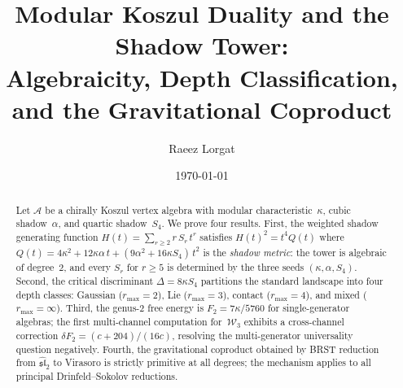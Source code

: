 \documentclass[11pt,reqno]{amsart}
\theoremstyle{definition}
\theoremstyle{remark}
\newcommand{\cA}{\mathcal{A}}
\newcommand{\cW}{\mathcal{W}}
\numberwithin{equation}{section}
\begin{document}
\title[Modular Koszul Duality and the Shadow Tower]
{Modular Koszul Duality and the Shadow Tower:\\
Algebraicity, Depth Classification,\\
and the Gravitational Coproduct}

\author{Raeez Lorgat}
\address{Perimeter Institute for Theoretical Physics,
 Waterloo, ON N2L 2Y5, Canada}

\date{\today}

\begin{abstract}
Let $\cA$ be a chirally Koszul vertex algebra with modular
characteristic~$\kappa$, cubic shadow~$\alpha$, and quartic
shadow~$S_4$. We prove four results.
First, the weighted shadow generating function
$H(t) = \sum_{r \ge 2} r\, S_r\, t^r$ satisfies
$H(t)^2 = t^4 Q(t)$ where
$Q(t) = 4\kappa^2 + 12\kappa\alpha\, t
+ (9\alpha^2 + 16\kappa S_4)\, t^2$
is the \emph{shadow metric}: the tower is algebraic of degree~$2$,
and every $S_r$ for $r \ge 5$ is determined by the three seeds
$(\kappa, \alpha, S_4)$.
Second, the critical discriminant $\Delta = 8\kappa S_4$
partitions the standard landscape into four depth classes:
Gaussian ($r_{\max} = 2$), Lie ($r_{\max} = 3$), contact
($r_{\max} = 4$), and mixed ($r_{\max} = \infty$).
Third, the genus-$2$ free energy is
$F_2 = 7\kappa/5760$ for single-generator algebras; the first
multi-channel computation for~$\cW_3$ exhibits a cross-channel
correction $\delta F_2 = (c{+}204)/(16c)$, resolving the
multi-generator universality question negatively.
Fourth, the gravitational coproduct obtained by BRST reduction
from $\widehat{\mathfrak{sl}}_2$ to Virasoro is strictly primitive
at all degrees; the mechanism applies to all principal
Drinfeld--Sokolov reductions.
\end{abstract}



\maketitle

\end{document}
